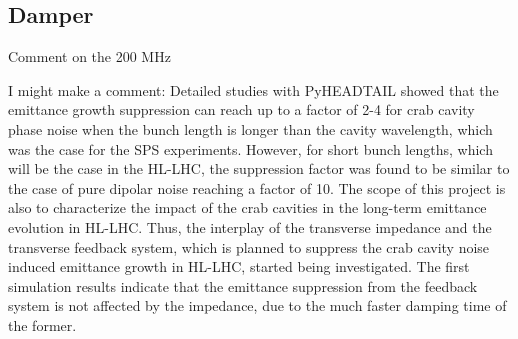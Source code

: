 \subsection{Damper}
Comment on the 200 MHz

I might make a comment:
Detailed studies with PyHEADTAIL showed that the emittance growth suppression can reach up to a factor of 2-4 for crab cavity phase noise when the bunch length is longer than the cavity wavelength, which was the case for the SPS experiments. However, for short bunch lengths, which will be the case in the HL-LHC, the suppression factor was found to be similar to the case of pure dipolar noise reaching a factor of 10. The scope of this project is also to characterize the impact of the crab cavities in the long-term emittance evolution in HL-LHC. Thus, the interplay of the transverse impedance and the transverse feedback system, which is planned to suppress the crab cavity noise induced emittance growth in HL-LHC, started being investigated. The first simulation results indicate that the emittance suppression from the feedback system is not affected by the impedance, due to the much faster damping time of the former.


